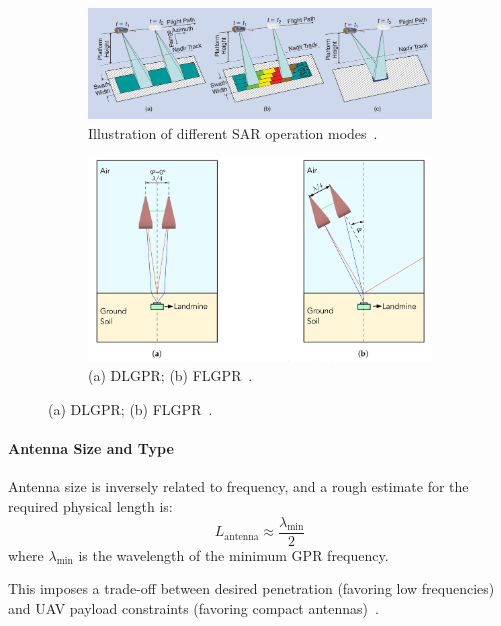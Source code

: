 \begin{figure}[h!]
    \centering
    \begin{subfigure}[b]{0.48\linewidth}
        \centering
        \includegraphics[width=\linewidth]{figs/Huirui/sar_modes.png}
        \caption{Illustration of different SAR operation modes~\cite{moreira2013tutorial}.}
        \label{fig:freq_tradeoff}
    \end{subfigure}
    \hfill
    \begin{subfigure}[b]{0.48\linewidth}
        \centering
        \includegraphics[width=\linewidth]{figs/Huirui/gpr_ori_modes.png}
        \caption{(a) DLGPR; (b) FLGPR~\cite{vsipovs2020lightweight}.}
        \label{fig:bp_geometry}
    \end{subfigure}
\end{figure}


\paragraph{Antenna Size and Type}

Antenna size is inversely related to frequency, and a rough estimate for the required physical length is:
\[
L_{\text{antenna}} \approx \frac{\lambda_{\text{min}}}{2}
\]
where  $\lambda_{\text{min}}$ is the wavelength of the minimum GPR frequency.

This imposes a trade-off between desired penetration (favoring low frequencies) and UAV payload constraints (favoring compact antennas)~\cite{alqudsi2021review}.


